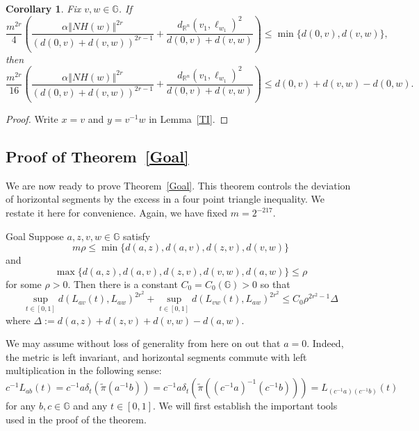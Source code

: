 \documentclass[11pt]{amsart}
\newtheorem{corollary}[theorem]{Corollary}
\theoremstyle{definition}
\numberwithin{theorem}{section} \numberwithin{equation}{section}
\begin{document}
\begin{corollary}
\label{TICor}
Fix $v,w \in \mathbb{G}$.
If
\begin{equation}
\label{CorAss}
\frac{m^{2r}}{4} \left( \frac{\alpha \left\Vert NH\left( w \right) \right\Vert^{2r}}{(d(0,v) + d(v,w))^{2r-1}} + \frac{d_{\mathbb{R}^n}(v_1,\ell_{w_1})^2 }{d(0,v) + d(v,w)} \right)
\leq \min \{ d(0,v), d(v,w) \},
\end{equation}
then 
\begin{equation}
\label{CorCon}
\frac{m^{2r}}{16} \left( \frac{\alpha \left\Vert NH\left( w \right) \right\Vert^{2r}}{(d(0,v) + d(v,w))^{2r-1}} + \frac{d_{\mathbb{R}^n}(v_1,\ell_{w_1})^2 }{d(0,v) + d(v,w)} \right)
\leq d(0,v) + d(v,w) - d(0,w).
\end{equation}
\end{corollary}
\begin{proof}
Write $x=v$ and $y=v^{-1}w$ in Lemma~\ref{TI}.
\end{proof}



\subsection{Proof of Theorem~\ref{Goal}}

We are now ready to prove Theorem~\ref{Goal}.
This theorem controls the deviation of horizontal segments 
by the excess in a four point triangle inequality.
We restate it here for convenience.
Again, we have fixed $m = 2^{-217}$.%
\begin{reptheorem}{Goal}
Suppose $a,z,v,w \in \mathbb{G}$ satisfy
$$
m \rho \leq \min \{ d(a,z), d(a,v), d(z,v), d(v,w) \}
$$
and
$$
\max \{ d(a,z), d(a,v), d(z,v), d(v,w), d(a,w) \} \leq \rho
$$
for some $\rho > 0$.
Then there is a constant $C_0 = C_0(\mathbb{G}) > 0$ so that
$$
\sup_{t \in [0,1]} d(L_{av}(t),L_{aw})^{2r^2} + \sup_{t \in [0,1]} d(L_{vw}(t),L_{aw})^{2r^2}
\leq C_0 \rho^{2r^2-1} \Delta
$$
where $\Delta := d(a,z) + d(z,v) + d(v,w) - d(a,w)$.
\end{reptheorem}

We may assume without loss of generality from here on out that $a=0$.
Indeed, the metric is left invariant, and horizontal segments commute with left multiplication in the following sense:
$$
c^{-1} L_{ab}(t) 
= c^{-1} a \delta_t (\tilde{\pi}(a^{-1}b))
= c^{-1} a \delta_t (\tilde{\pi}((c^{-1}a)^{-1}(c^{-1}b)))
=L_{(c^{-1}a)(c^{-1}b)}(t)
$$
for any $b,c \in \mathbb{G}$ and any $t \in [0,1]$.
We will first establish the important tools used in the proof of the theorem.
\end{document}

